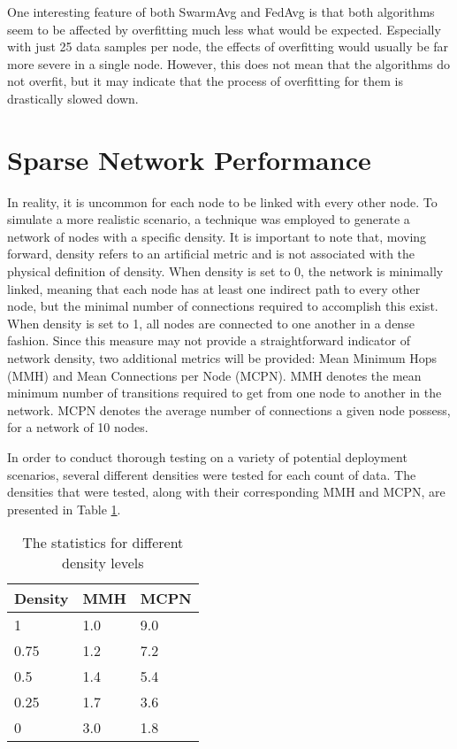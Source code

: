 One interesting feature of both SwarmAvg and FedAvg is that both algorithms seem to be affected by overfitting much less what would be expected. Especially with just 25 data samples per node, the effects of overfitting would usually be far more severe in a single node. However, this does not mean that the algorithms do not overfit, but it may indicate that the process of overfitting for them is drastically slowed down.

\section{Sparse Network Performance}
In reality, it is uncommon for each node to be linked with every other node. To simulate a more realistic scenario, a technique was employed to generate a network of nodes with a specific density. It is important to note that, moving forward, density refers to an artificial metric and is not associated with the physical definition of density. When density is set to 0, the network is minimally linked, meaning that each node has at least one indirect path to every other node, but the minimal number of connections required to accomplish this exist. When density is set to 1, all nodes are connected to one another in a dense fashion. Since this measure may not provide a straightforward indicator of network density, two additional metrics will be provided:  Mean Minimum Hops (MMH) and Mean Connections per Node (MCPN). MMH denotes the mean minimum number of transitions required to get from one node to another in the network. MCPN denotes the average number of connections a given node possess, for a network of 10 nodes.

In order to conduct thorough testing on a variety of potential deployment scenarios, several different densities were tested for each count of data. The densities that were tested, along with their corresponding MMH and MCPN, are presented in Table \ref{sparsedensities}.

\begin{table}[H]
	\centering
	\begin{tabular}{l|l|l}
		Density & MMH & MCPN \\ \hline
		1 & 1.0 & 9.0 \\
		0.75    & 1.2 & 7.2  \\
		0.5    & 1.4 & 5.4  \\
		0.25    & 1.7 & 3.6  \\
		0    & 3.0 & 1.8  \\
	\end{tabular}
	\caption{The statistics for different density levels} \label{sparsedensities}
\end{table}

